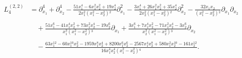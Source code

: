 \documentclass[12pt]{amsart}
\numberwithin{equation}{section}
\theoremstyle{definition}
\begin{document}
\begin{align*}
    L_4^{(2,2)} &= \partial_{x_1}^4+\partial_{x_2}^4 
    -\frac{51 x_1^4-6 x_1^2 x_2^2 +19 x_2^4}{2 x_1^2 \left(x_1^2-x_2^2\right){}^2}\partial_{x_1}^2
    -\frac{3 x_1^4+26 x_1^2x_2^2 +35x_2^4}{2x_2^2 \left(x_1^2-x_2^2\right){}^2 }\partial_{x_2}^2 
    -\frac{32 x_1 x_2 }{\left(x_1^2-x_2^2\right){}^2}\partial_{x_1}\partial_{x_2} \\ \ \\
    &\quad  
    +\frac{51 x_1^6-41 x_1^4 x_2^2 +73 x_1^2x_2^4 -19x_2^6}{x_1^3 \left(x_1^2-x_2^2\right){}^3 }\partial_{x_1} 
    +\frac{3 x_1^6+7 x_1^4x_2^2 -71 x_1^2x_2^4 -3 x_2^6}{x_2^3\left(x_1^2-x_2^2\right){}^3}\partial_{x_2} \\ \ \\
    &\quad -\frac{63 x_1^{12}-60  x_1^{10}x_2^2-1959 x_1^8x_2^4 +8200 x_1^6x_2^6 -2567 x_1^4x_2^8 +580 x_1^2x_2^{10} -161 x_2^{12}}{16 x_1^4x_2^4 \left(x_1^2-x_2^2\right){}^4  }.
\end{align*}
\end{document}
